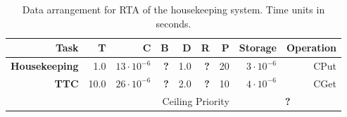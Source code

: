 \begingroup
\setlength{\tabcolsep}{8pt} %
\renewcommand{\arraystretch}{1.2} %

\begin{table}[htb]
	\begin{center}
		
		\small %
		
		\begin{tabular}{|r r r r r r r |r r|} \hline
			\textbf{Task} & T & C & B & D & R & P & Storage & Operation\\ \hline
			
			\textbf{Housekeeping} & 1.0 & $13\cdot10^{-6}$ & \textcolor{mRedBrown}{\textbf{?}} & 1.0 & \textcolor{mRedBrown}{\textbf{?}} & 20 & $3\cdot10^{-6}$ & CPut \\
			
			\textbf{TTC} & 10.0 & $26\cdot10^{-6}$ & \textcolor{mRedBrown}{\textbf{?}} & 2.0 & \textcolor{mRedBrown}{\textbf{?}} & 10 & $4\cdot10^{-6}$ & CGet \\ \hline
			
			\multicolumn{7}{|r|}{Ceiling Priority} & \multicolumn{2}{|c|}{\textcolor{mRedBrown}{\textbf{?}}} \\ \hline
		\end{tabular}
		\caption{Data arrangement for RTA of the housekeeping system. Time units in seconds.}
		\label{tb:wcet}
	\end{center}
\end{table}

\endgroup